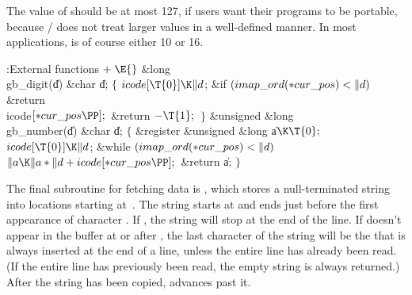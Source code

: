The value of  should be at most 127, if users want their programs
to be
portable, because \CEE/ does not treat larger  values in a
well-defined manner. In most applications,  is of course either 10 or
16.

\Y\B\4:External functions\X${}\mathrel+\E{}$\6
\1\1\&{long} \\{gb\_digit}(\|d)\6
\&{char} \|d;\2\2\6
${}\{{}$\1\6
${}\\{icode}[\T{0}]\K\|d{}$;\6
\&{if} ${}(\\{imap\_ord}({*}\\{cur\_pos})<\|d){}$\1\5
\&{return} \\{icode}${}[{*}\\{cur\_pos}\PP];{}$\2\6
\&{return} ${}{-}\T{1};{}$\6
\4${}\}{}$\2\7
\1\1\&{unsigned} \&{long} \\{gb\_number}(\|d)\6
\&{char} \|d;\2\2\6
${}\{{}$\5
\1\&{register} \&{unsigned} \&{long} \|a${}\K\T{0};{}$\7
${}\\{icode}[\T{0}]\K\|d{}$;\6
\&{while} ${}(\\{imap\_ord}({*}\\{cur\_pos})<\|d){}$\1\5
${}\|a\K\|a*\|d+\\{icode}[{*}\\{cur\_pos}\PP];{}$\2\6
\&{return} \|a;\6
\4${}\}{}$\2\par
\fi

The final subroutine for fetching data is ,
which
stores a null-terminated string into locations starting at~.
The string starts at  and ends just before the first
appearance
of character . If , the string will stop at the
end of the line.
If  doesn't appear in the buffer at or after , the
last character
of the string will be the  that is always inserted at the end
of a line, unless the entire line has already been read. (If the entire
line has previously been read, the empty string is always returned.)
After the string has been copied,  advances past it.

